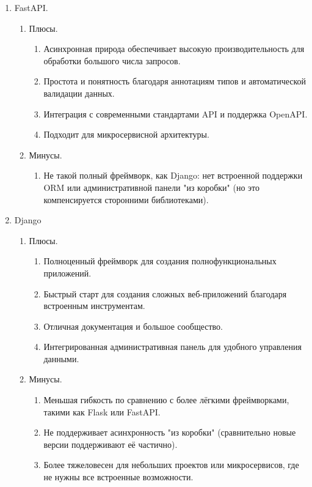 \begin{enumerate}
	\item FastAPI.
	\begin{enumerate}
		\item Плюсы.
		\begin{enumerate}
			\item Асинхронная природа обеспечивает высокую производительность для обработки большого числа запросов.
			\item Простота и понятность благодаря аннотациям типов и автоматической валидации данных.
			\item Интеграция с современными стандартами API и поддержка OpenAPI.
			\item Подходит для микросервисной архитектуры.
		\end{enumerate}

		\item Минусы.
		\begin{enumerate}
			\item Не такой полный фреймворк, как Django: нет встроенной поддержки ORM или административной панели "из коробки" (но это компенсируется сторонними библиотеками).
		\end{enumerate}
	\end{enumerate}

	\item Django
	\begin{enumerate}
		\item Плюсы.
		\begin{enumerate}
			\item Полноценный фреймворк для создания полнофункциональных приложений.
			\item Быстрый старт для создания сложных веб-приложений благодаря встроенным инструментам.
			\item Отличная документация и большое сообщество.
			\item Интегрированная административная панель для удобного управления данными.
		\end{enumerate}

		\item Минусы.
		\begin{enumerate}
			\item Меньшая гибкость по сравнению с более лёгкими фреймворками, такими как Flask или FastAPI.
			\item Не поддерживает асинхронность "из коробки" (сравнительно новые версии поддерживают её частично).
			\item Более тяжеловесен для небольших проектов или микросервисов, где не нужны все встроенные возможности.
		\end{enumerate}
	\end{enumerate}


\end{enumerate}
